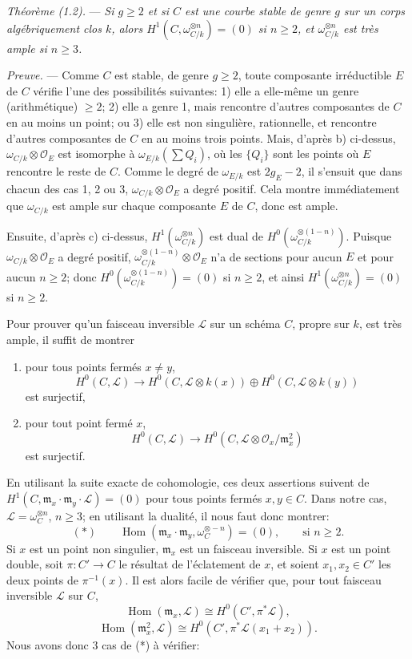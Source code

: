 \documentclass[10pt]{article}
\newcommand{\Hom}{\operatorname{Hom}}
\newcommand{\cO}{\mathcal O}
\newcommand{\cL}{\mathcal L}
\begin{document}
\medskip
\noindent\textit{Théorème (1.2).} --- \textit{Si $g\geq 2$ et si $C$ est une courbe stable de genre $g$ sur un corps algébriquement clos $k$, alors $H^1(C,\omega_{C/k}^{\otimes n})=(0)$ si $n\geq 2$, et $\omega_{C/k}^{\otimes n}$ est très ample si $n\geq 3$.}

\medskip
\noindent\textit{Preuve.} --- Comme $C$ est stable, de genre $g\geq 2$, toute composante irréductible $E$ de $C$ vérifie l'une des possibilités suivantes: 1) elle a elle-même un genre (arithmétique) $\geq 2$; 2) elle a genre 1, mais rencontre d'autres composantes de $C$ en au moins un point; ou 3) elle est non singulière, rationnelle, et rencontre d'autres composantes de $C$ en au moins trois points. Mais, d'après b) ci-dessus, $\omega_{C/k}\otimes\cO_E$ est isomorphe à $\omega_{E/k}(\sum Q_i)$, où les $\{Q_i\}$ sont les points où $E$ rencontre le reste de $C$. Comme le degré de $\omega_{E/k}$ est $2g_E-2$, il s'ensuit que dans chacun des cas 1, 2 ou 3, $\omega_{C/k}\otimes\cO_E$ a degré positif. Cela montre immédiatement que $\omega_{C/k}$ est ample sur chaque composante $E$ de $C$, donc est ample.

Ensuite, d'après c) ci-dessus, $H^1(\omega_{C/k}^{\otimes n})$ est dual de $H^0(\omega_{C/k}^{\otimes(1-n)})$. Puisque $\omega_{C/k}\otimes\cO_E$ a degré positif, $\omega_{C/k}^{\otimes(1-n)}\otimes\cO_E$ n'a de sections pour aucun $E$ et pour aucun $n\geq 2$; donc $H^0(\omega_{C/k}^{\otimes(1-n)})=(0)$ si $n\geq 2$, et ainsi $H^1(\omega_{C/k}^{\otimes n})=(0)$ si $n\geq 2$.

Pour prouver qu'un faisceau inversible $\cL$ sur un schéma $C$, propre sur $k$, est très ample, il suffit de montrer
\begin{enumerate}[label=\alph*)]
\item pour tous points fermés $x\ne y$,
\[
H^0(C,\cL)\to H^0(C,\cL\otimes k(x))\oplus H^0(C,\cL\otimes k(y))
\]
est surjectif,
\item pour tout point fermé $x$,
\[
H^0(C,\cL)\to H^0(C,\cL\otimes \cO_x/\mathfrak m_x^2)
\]
est surjectif.
\end{enumerate}
En utilisant la suite exacte de cohomologie, ces deux assertions suivent de $H^1(C,\mathfrak m_x\cdot \mathfrak m_y\cdot\cL)=(0)$ pour tous points fermés $x,y\in C$. Dans notre cas, $\cL=\omega_C^{\otimes n}$, $n\geq 3$; en utilisant la dualité, il nous faut donc montrer:
\[
(*)\qquad \Hom(\mathfrak m_x\cdot \mathfrak m_y,\omega_C^{\otimes -n})=(0),\qquad \text{si } n\geq 2.
\]
Si $x$ est un point non singulier, $\mathfrak m_x$ est un faisceau inversible. Si $x$ est un point double, soit $\pi:C'\to C$ le résultat de l'éclatement de $x$, et soient $x_1,x_2\in C'$ les deux points de $\pi^{-1}(x)$. Il est alors facile de vérifier que, pour tout faisceau inversible $\cL$ sur $C$,
\[
\Hom(\mathfrak m_x,\cL)\cong H^0(C',\pi^*\cL),
\]
\[
\Hom(\mathfrak m_x^2,\cL)\cong H^0(C',\pi^*\cL(x_1+x_2)).
\]
Nous avons donc 3 cas de (*) à vérifier:
\end{document}
